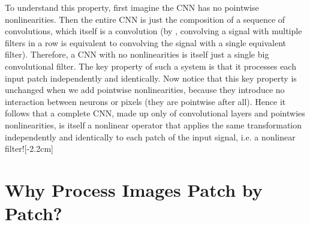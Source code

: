 To understand this property, first imagine the CNN has no pointwise nonlinearities. Then the entire CNN is just the composition of a sequence of convolutions, which itself is a convolution (by \eqn{\ref{eqn:linear_image_filtering:conv_associative_property}}, convolving a signal with multiple filters in a row is equivalent to convolving the signal with a single equivalent filter). Therefore, a CNN with no nonlinearities is itself just a single big convolutional filter. The key property of such a system is that it processes each input patch independently and identically. Now notice that this key property is unchanged when we add pointwise nonlinearities, because they introduce no interaction between neurons or pixels (they are pointwise after all). Hence it follows that a complete CNN, made up only of convolutional layers and pointwies nonlinearities, is itself a nonlinear operator that applies the same transformation independently and identically to each patch of the input signal, i.e. a nonlinear filter![-2.2cm]




\section{Why Process Images Patch by Patch?}\label{sec:convolutional_neural_nets:key_properties}

